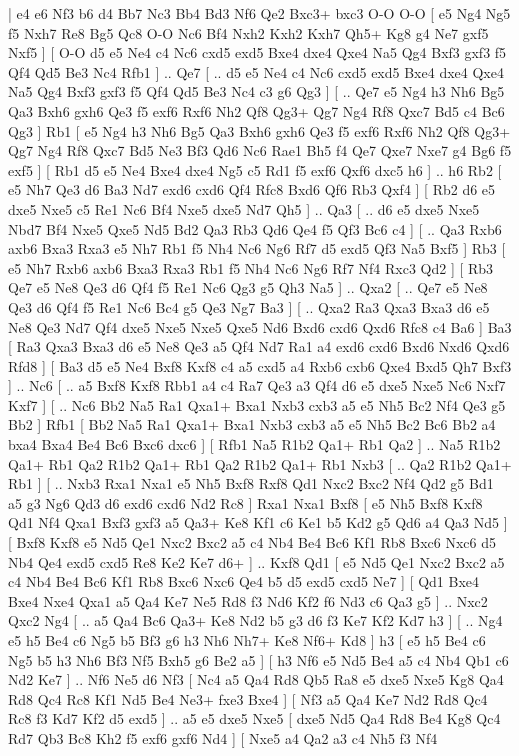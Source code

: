 \makegametitle 
|   e4   e6    Nf3   b6    d4   Bb7   Nc3  Bb4    Bd3   Nf6    Qe2  Bxc3+   bxc3   O-O    O-O [  e5 Ng4  Ng5 f5  Nxh7 Re8  Bg5 Qc8  O-O Nc6  Bf4 Nxh2  Kxh2 Kxh7  Qh5+ Kg8  g4 Ne7  gxf5 Nxf5   ]  [  O-O d5  e5 Ne4  c4 Nc6  cxd5 exd5  Bxe4 dxe4  Qxe4 Na5  Qg4 Bxf3  gxf3 f5  Qf4 Qd5  Be3 Nc4  Rfb1   ] .. Qe7 [ .. d5  e5 Ne4  c4 Nc6  cxd5 exd5  Bxe4 dxe4  Qxe4 Na5  Qg4 Bxf3  gxf3 f5  Qf4 Qd5  Be3 Nc4  c3 g6  Qg3   ]  [ .. Qe7  e5 Ng4  h3 Nh6  Bg5 Qa3  Bxh6 gxh6  Qe3 f5  exf6 Rxf6  Nh2 Qf8  Qg3+ Qg7  Ng4 Rf8  Qxc7 Bd5  c4 Bc6  Qg3   ]  Rb1 [  e5 Ng4  h3 Nh6  Bg5 Qa3  Bxh6 gxh6  Qe3 f5  exf6 Rxf6  Nh2 Qf8  Qg3+ Qg7  Ng4 Rf8  Qxc7 Bd5  Ne3 Bf3  Qd6 Nc6  Rae1 Bh5  f4 Qe7  Qxe7 Nxe7  g4 Bg6  f5 exf5   ]  [  Rb1 d5  e5 Ne4  Bxe4 dxe4  Ng5 c5  Rd1 f5  exf6 Qxf6  dxc5 h6   ] .. h6    Rb2 [  e5 Nh7  Qe3 d6  Ba3 Nd7  exd6 cxd6  Qf4 Rfc8  Bxd6 Qf6  Rb3 Qxf4   ]  [  Rb2 d6  e5 dxe5  Nxe5 c5  Re1 Nc6  Bf4 Nxe5  dxe5 Nd7  Qh5   ] .. Qa3 [ .. d6  e5 dxe5  Nxe5 Nbd7  Bf4 Nxe5  Qxe5 Nd5  Bd2 Qa3  Rb3 Qd6  Qe4 f5  Qf3 Bc6  c4   ]  [ .. Qa3  Rxb6 axb6  Bxa3 Rxa3  e5 Nh7  Rb1 f5  Nh4 Nc6  Ng6 Rf7  d5 exd5  Qf3 Na5  Bxf5   ]  Rb3 [  e5 Nh7  Rxb6 axb6  Bxa3 Rxa3  Rb1 f5  Nh4 Nc6  Ng6 Rf7  Nf4 Rxc3  Qd2   ]  [  Rb3 Qe7  e5 Ne8  Qe3 d6  Qf4 f5  Re1 Nc6  Qg3 g5  Qh3 Na5   ] .. Qxa2 [ .. Qe7  e5 Ne8  Qe3 d6  Qf4 f5  Re1 Nc6  Bc4 g5  Qe3 Ng7  Ba3   ]  [ .. Qxa2  Ra3 Qxa3  Bxa3 d6  e5 Ne8  Qe3 Nd7  Qf4 dxe5  Nxe5 Nxe5  Qxe5 Nd6  Bxd6 cxd6  Qxd6 Rfc8  c4 Ba6   ]  Ba3 [  Ra3 Qxa3  Bxa3 d6  e5 Ne8  Qe3 a5  Qf4 Nd7  Ra1 a4  exd6 cxd6  Bxd6 Nxd6  Qxd6 Rfd8   ]  [  Ba3 d5  e5 Ne4  Bxf8 Kxf8  c4 a5  cxd5 a4  Rxb6 cxb6  Qxe4 Bxd5  Qh7 Bxf3   ] .. Nc6 [ .. a5  Bxf8 Kxf8  Rbb1 a4  c4 Ra7  Qe3 a3  Qf4 d6  e5 dxe5  Nxe5 Nc6  Nxf7 Kxf7   ]  [ .. Nc6  Bb2 Na5  Ra1 Qxa1+  Bxa1 Nxb3  cxb3 a5  e5 Nh5  Bc2 Nf4  Qe3 g5  Bb2   ]  Rfb1 [  Bb2 Na5  Ra1 Qxa1+  Bxa1 Nxb3  cxb3 a5  e5 Nh5  Bc2 Bc6  Bb2 a4  bxa4 Bxa4  Be4 Bc6  Bxc6 dxc6   ]  [  Rfb1 Na5  R1b2 Qa1+  Rb1 Qa2   ] .. Na5    R1b2   Qa1+    Rb1   Qa2    R1b2   Qa1+    Rb1   Qa2    R1b2   Qa1+    Rb1   Nxb3 [ .. Qa2  R1b2 Qa1+  Rb1   ]  [ .. Nxb3  Rxa1 Nxa1  e5 Nh5  Bxf8 Rxf8  Qd1 Nxc2  Bxc2 Nf4  Qd2 g5  Bd1 a5  g3 Ng6  Qd3 d6  exd6 cxd6  Nd2 Rc8   ]  Rxa1   Nxa1    Bxf8 [  e5 Nh5  Bxf8 Kxf8  Qd1 Nf4  Qxa1 Bxf3  gxf3 a5  Qa3+ Ke8  Kf1 c6  Ke1 b5  Kd2 g5  Qd6 a4  Qa3 Nd5   ]  [  Bxf8 Kxf8  e5 Nd5  Qe1 Nxc2  Bxc2 a5  c4 Nb4  Be4 Bc6  Kf1 Rb8  Bxc6 Nxc6  d5 Nb4  Qe4 exd5  cxd5 Re8  Ke2 Ke7  d6+   ] .. Kxf8    Qd1 [  e5 Nd5  Qe1 Nxc2  Bxc2 a5  c4 Nb4  Be4 Bc6  Kf1 Rb8  Bxc6 Nxc6  Qe4 b5  d5 exd5  cxd5 Ne7   ]  [  Qd1 Bxe4  Bxe4 Nxe4  Qxa1 a5  Qa4 Ke7  Ne5 Rd8  f3 Nd6  Kf2 f6  Nd3 c6  Qa3 g5   ] .. Nxc2    Qxc2   Ng4 [ .. a5  Qa4 Bc6  Qa3+ Ke8  Nd2 b5  g3 d6  f3 Ke7  Kf2 Kd7  h3   ]  [ .. Ng4  e5 h5  Be4 c6  Ng5 b5  Bf3 g6  h3 Nh6  Nh7+ Ke8  Nf6+ Kd8   ]  h3 [  e5 h5  Be4 c6  Ng5 b5  h3 Nh6  Bf3 Nf5  Bxh5 g6  Be2 a5   ]  [  h3 Nf6  e5 Nd5  Be4 a5  c4 Nb4  Qb1 c6  Nd2 Ke7   ] .. Nf6    Ne5   d6    Nf3 [  Nc4 a5  Qa4 Rd8  Qb5 Ra8  e5 dxe5  Nxe5 Kg8  Qa4 Rd8  Qc4 Rc8  Kf1 Nd5  Be4 Ne3+  fxe3 Bxe4   ]  [  Nf3 a5  Qa4 Ke7  Nd2 Rd8  Qc4 Rc8  f3 Kd7  Kf2 d5  exd5   ] .. a5    e5   dxe5    Nxe5 [  dxe5 Nd5  Qa4 Rd8  Be4 Kg8  Qc4 Rd7  Qb3 Bc8  Kh2 f5  exf6 gxf6  Nd4   ]  [  Nxe5 a4  Qa2 a3  c4 Nh5  f3 Nf4 